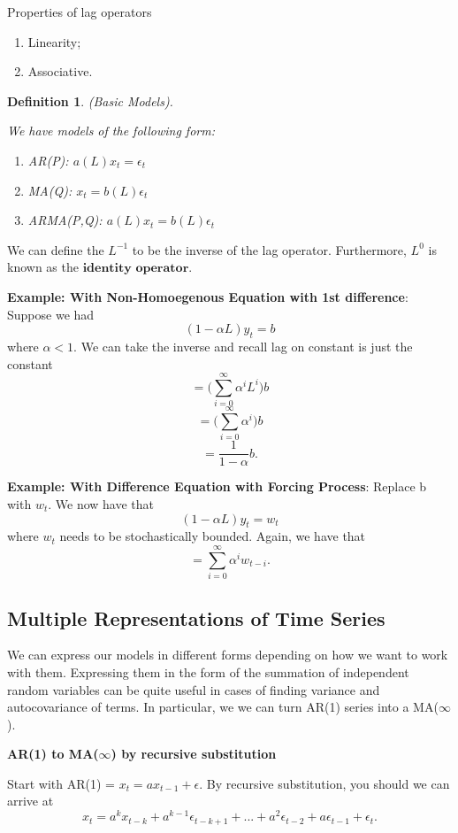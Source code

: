\documentclass[twoside]{article}
\newtheorem{definition}[theorem]{Definition}
\begin{document}
Properties of lag operators
\begin{enumerate}
\item Linearity;
\item Associative.
\end{enumerate}


\begin{definition}
(Basic Models).

We have models of the following form:
\begin{enumerate}
    \item AR(P): $a(L)x_t = \epsilon_t$
    \item MA(Q): $x_t = b(L)\epsilon_t$
    \item ARMA(P,Q): $a(L)x_t = b(L)\epsilon_t$
\end{enumerate}
\end{definition}

We can define the $L^{-1}$ to be the inverse of the lag operator. Furthermore, $L^0$ is known as the $\textbf{identity operator}$.

\bigskip
\textbf{Example: With Non-Homoegenous Equation with 1st difference}:
Suppose we had 
$$
(1 - \alpha L)y_t = b
$$
where $\alpha < 1$. We can take the inverse and recall lag on constant is just the constant
$$
= \big(\sum_{i=0}^{\infty}\alpha^i L^i\big)b 
$$
$$
= \big(\sum_{i=0}^{\infty}\alpha^i\big)b 
$$
$$
= \frac{1}{1 - \alpha}b.
$$

\bigskip
\textbf{Example: With Difference Equation with Forcing Process}:
Replace b with $w_t$. We now have that
$$
(1 - \alpha L)y_t = w_t
$$
where $w_t$ needs to be stochastically bounded. Again, we have that
$$
= \sum_{i=0}^{\infty}\alpha^iw_{t-i}.
$$

\subsection{Multiple Representations of Time Series}
We can express our models in different forms depending on how we want to work with them. Expressing them in the form of the summation of independent random variables can be quite useful in cases of finding variance and autocovariance of terms. In particular, we we can turn AR(1) series into a MA($\infty$).

\bigskip
\textbf{AR(1) to MA($\infty$) by recursive substitution}

Start with AR(1) = $x_t = ax_{t-1} + \epsilon$. By recursive substitution, you should we can arrive at
$$
x_t = a^kx_{t-k} + a^{k-1}\epsilon_{t-k+1} + ... + a^{2}\epsilon_{t-2} + a\epsilon_{t-1} + \epsilon_t.
$$
\end{document}
